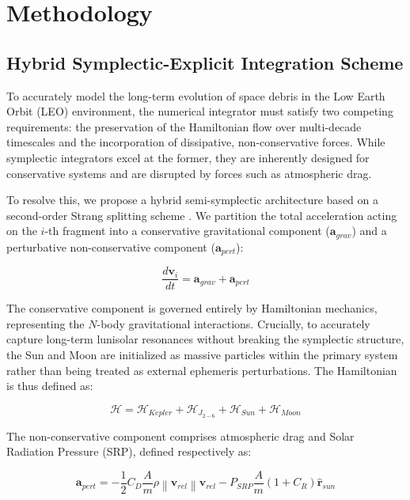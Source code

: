 \documentclass[letterpaper, paper,11pt]{AAS}
\begin{document}
\section{Methodology}

\subsection{Hybrid Symplectic-Explicit Integration Scheme}
To accurately model the long-term evolution of space debris in the Low Earth Orbit (LEO) environment, the numerical integrator must satisfy two competing requirements: the preservation of the Hamiltonian flow over multi-decade timescales and the incorporation of dissipative, non-conservative forces. While symplectic integrators excel at the former, they are inherently designed for conservative systems and are disrupted by forces such as atmospheric drag.

To resolve this, we propose a hybrid semi-symplectic architecture based on a second-order Strang splitting scheme \cite{Puerta2025}. We partition the total acceleration acting on the $i$-th fragment into a conservative gravitational component ($\mathbf{a}_{grav}$) and a perturbative non-conservative component ($\mathbf{a}_{pert}$):

\begin{equation}
    \frac{d\mathbf{v}_i}{dt} = \mathbf{a}_{grav} + \mathbf{a}_{pert}
\end{equation}

The conservative component is governed entirely by Hamiltonian mechanics, representing the $N$-body gravitational interactions. Crucially, to accurately capture long-term lunisolar resonances without breaking the symplectic structure, the Sun and Moon are initialized as massive particles within the primary system rather than being treated as external ephemeris perturbations. The Hamiltonian is thus defined as:

\begin{equation}
    \mathcal{H} = \mathcal{H}_{Kepler} + \mathcal{H}_{J_{2-6}} + \mathcal{H}_{Sun} + \mathcal{H}_{Moon}
\end{equation}

The non-conservative component comprises atmospheric drag and Solar Radiation Pressure (SRP), defined respectively as:

\begin{equation}
    \mathbf{a}_{pert} = -\frac{1}{2} C_D \frac{A}{m} \rho \left\| \mathbf{v}_{rel} \right\| \mathbf{v}_{rel} - P_{SRP} \frac{A}{m} (1 + C_R) \mathbf{\hat{r}}_{sun}
\end{equation}
\end{document}
